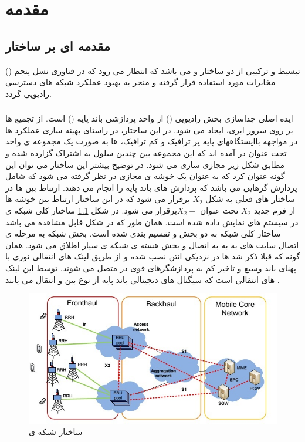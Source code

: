 \chapter{مقدمه}
\section{مقدمه ای بر ساختار }
()
تبسیط و ترکیبی از دو ساختار  و  می باشد که انتظار می رود که در فناوری نسل پنجم مخابرات مورد استفاده قرار گرفته و منجر به بهبود عملکرد شبکه های دسترسی رادیویی  گردد.
\subsection{} 
ایده اصلی  جداسازی بخش رادیویی () 
 از واحد پردازشی باند پایه ()
  است.
از تجمیع  ها بر روی سرور ابری،  ایجاد می شود.
در این ساختار، در راستای بهینه سازی عملکرد 
 ها در مواجهه باایستگاههای پایه پر ترافیک و کم ترافیک،
 ها به صورت یک مجموعه ی واحد تحت عنوان 
 در آمده اند که این مجموعه بین چندین سلول 
 به اشتراک گزارده شده و مطابق شکل زیر مجازی سازی
می شود. 
در توضیح بیشتر این ساختار می توان این گونه
عنوان کرد که  به عنوان یک خوشه ی مجازی
در نظر گرفته می شود که شامل پردازش گرهایی می باشد
که پردازش های باند پایه را انجام می دهند. ارتباط بین
  ها در ساختار های فعلی به شکل  $X_2$ برقرار می شود
که در این ساختار ارتباط بین خوشه ها از فرم جدید $X_2$
تحت عنوان  $X_2 +$برقرار می شود.
\newline
در شکل \ref{fig:C-RAN} ساختار کلی شبکه ی   در سیستم های
 نمایش داده شده است. همان طور که در شکل قابل
مشاهده می باشد ساختار کلی شبکه   به دو بخش
  و  تقسیم بندی شده است. بخش
 شبکه به مرحله ی اتصال سایت های به
 به  به اتصال  و بخش 
هسته ی شبکه ی سیار اطلاق می شود. همان گونه که قبلا
ذکر شد  ها در نزدیکی انتن نصب شده و از طریق
لینک های انتقالی نوری با پهنای باند وسیع و تاخیر کم به
پردازشگرهای قوی در  متصل می شوند. توسط این
لینک های انتقالی است که سیگنال های دیجیتالی باند
پایه از نوع  بین  و  انتقال می یابند \cite{checko2015cloud}.
\begin{figure}[H]
  \centering
    \includegraphics[width=\textwidth]{./fig/CRAN}
  \caption{ساختار شبکه ی  \cite{checko2015cloud}}
  \label{fig:C-RAN}
\end{figure}
